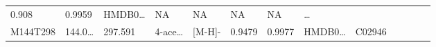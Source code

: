 \documentclass[
]{article}
\begin{document}
\begin{longtable}[]{@{}lllllllllllll@{}}
\begin{minipage}[t]{0.07\columnwidth}
0.908\strut
\end{minipage} & \begin{minipage}[t]{0.07\columnwidth}\raggedright
0.9959\strut
\end{minipage} & \begin{minipage}[t]{0.05\columnwidth}\raggedright
HMDB0\ldots{}\strut
\end{minipage} & \begin{minipage}[t]{0.04\columnwidth}\raggedright
NA\strut
\end{minipage} & \begin{minipage}[t]{0.05\columnwidth}\raggedright
NA\strut
\end{minipage} & \begin{minipage}[t]{0.05\columnwidth}\raggedright
NA\strut
\end{minipage} & \begin{minipage}[t]{0.05\columnwidth}\raggedright
NA\strut
\end{minipage} & \begin{minipage}[t]{0.02\columnwidth}\raggedright
\ldots{}\strut
\end{minipage}\tabularnewline
\begin{minipage}[t]{0.05\columnwidth}\raggedright
M144T298\strut
\end{minipage} & \begin{minipage}[t]{0.05\columnwidth}\raggedright
144.0\ldots{}\strut
\end{minipage} & \begin{minipage}[t]{0.05\columnwidth}\raggedright
297.591\strut
\end{minipage} & \begin{minipage}[t]{0.05\columnwidth}\raggedright
4-ace\ldots{}\strut
\end{minipage} & \begin{minipage}[t]{0.05\columnwidth}\raggedright
{[}M-H{]}-\strut
\end{minipage} & \begin{minipage}[t]{0.07\columnwidth}\raggedright
0.9479\strut
\end{minipage} & \begin{minipage}[t]{0.07\columnwidth}\raggedright
0.9977\strut
\end{minipage} & \begin{minipage}[t]{0.05\columnwidth}\raggedright
HMDB0\ldots{}\strut
\end{minipage} & \begin{minipage}[t]{0.04\columnwidth}\raggedright
C02946\strut

\end{minipage}
\end{longtable}
\end{document}
